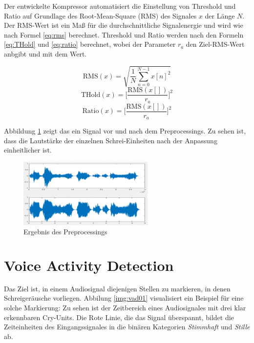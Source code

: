 Der entwickelte Kompressor automatisiert die Einstellung von Threshold und Ratio auf Grundlage des Root-Mean-Square (RMS) des Signales $x$ der Länge $N$. Der RMS-Wert ist ein Maß für die durchschnittliche Signalenergie und wird wie nach Formel \ref{eq:rms} berechnet. Threshold und Ratio werden nach den Formeln \ref{eq:THold} und \ref{eq:ratio} berechnet, wobei der Parameter $r_a$ den Ziel-RMS-Wert anbgibt und mit dem Wert.

\begin{equation}
\text{RMS}(x) = \sqrt{\frac{1}{N}\sum_{n=0}^{N-1}x[n]^2}
\label{eq:rms}
\end{equation}
\begin{equation}
\text{THold}(x) = \bigg[\frac{\text{RMS}(x[])}{r_a}\bigg]^{2}
\label{eq:THold}
\end{equation}
\begin{equation}
\text{Ratio}(x) = \bigg[\frac{\text{RMS}(x[])}{r_a}\bigg]^{2}
\label{eq:ratio}
\end{equation}

Abbildung \ref{img:compressing01} zeigt das ein Signal vor und nach dem Preprocessings. Zu sehen ist, dass die Lautstärke der einzelnen Schrei-Einheiten nach der Anpassung einheitlicher ist. 

\begin{figure}[h]
	\centering
	\includegraphics[width=0.6\textwidth]{bilder/compressing01.png}
	\caption{Ergebnis des Preprocessings}
	\label{img:compressing01}
\end{figure}

\section{Voice Activity Detection}
\label{sec:vad}

Das Ziel ist, in einem Audiosignal diejenigen Stellen zu markieren, in denen Schreigeräusche vorliegen. Abbilung \ref{img:vad01} visualisiert ein Beispiel für eine solche Markierung: Zu sehen ist der Zeitbereich eines Audiosignales mit drei klar erkennbaren Cry-Units. Die Rote Linie, die das Signal überspannt, bildet die Zeiteinheiten des Eingangssignales in die binären Kategorien \emph{Stimmhaft} und \emph{Stille} ab.

